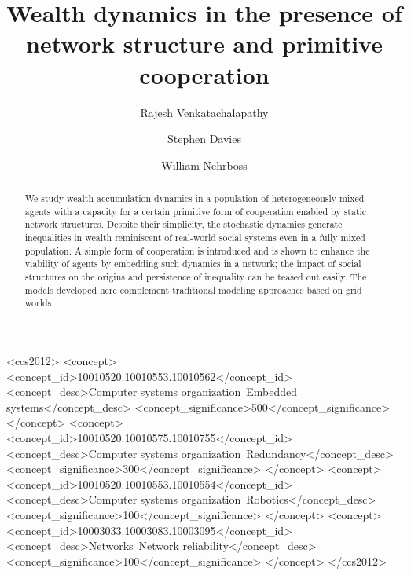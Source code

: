 \documentclass[sigconf]{acmart}
\begin{document}
\title{Wealth dynamics in the presence of network structure and primitive cooperation}

\author{Rajesh Venkatachalapathy}

\author{Stephen Davies}

\author{William Nehrboss}




\begin{abstract}
We study wealth accumulation dynamics in a population of heterogeneously mixed agents with a capacity for a certain primitive form of cooperation enabled by static network structures. Despite their simplicity, the stochastic dynamics generate inequalities in wealth reminiscent of real-world social systems even in a fully mixed population. A simple form of cooperation is introduced and is shown to enhance the viability of agents by embedding such dynamics in a network; the impact of social structures on the origins and persistence of inequality can be teased out easily. The models developed here complement traditional modeling approaches based on grid worlds.   

\end{abstract}

%
%
\begin{CCSXML}
<ccs2012>
 <concept>
  <concept_id>10010520.10010553.10010562</concept_id>
  <concept_desc>Computer systems organization~Embedded systems</concept_desc>
  <concept_significance>500</concept_significance>
 </concept>
 <concept>
  <concept_id>10010520.10010575.10010755</concept_id>
  <concept_desc>Computer systems organization~Redundancy</concept_desc>
  <concept_significance>300</concept_significance>
 </concept>
 <concept>
  <concept_id>10010520.10010553.10010554</concept_id>
  <concept_desc>Computer systems organization~Robotics</concept_desc>
  <concept_significance>100</concept_significance>
 </concept>
 <concept>
  <concept_id>10003033.10003083.10003095</concept_id>
  <concept_desc>Networks~Network reliability</concept_desc>
  <concept_significance>100</concept_significance>
 </concept>
</ccs2012>
\end{CCSXML}
\end{document}
